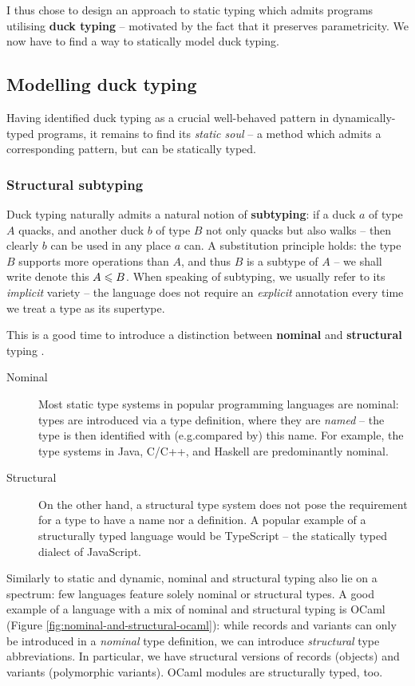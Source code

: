 I thus chose to design an approach to static typing which admits programs utilising \textbf{duck typing} -- motivated by the fact that it preserves parametricity. 
We now have to find a way to statically model duck typing.

\subsection{Modelling duck typing}
\label{subsec:duck-models}

Having identified duck typing as a crucial well-behaved pattern in dynamically-typed programs, it remains to find its \emph{static soul} -- a method which admits a corresponding pattern, but can be statically typed.

\subsubsection{Structural subtyping}

Duck typing naturally admits a natural notion of \textbf{subtyping}: if a duck $a$ of type $A$ quacks, and another duck $b$ of type $B$ not only quacks but also walks -- then clearly $b$ can be used in any place $a$ can. A substitution principle holds: the type $B$ supports more operations than $A$, and thus $B$ is a subtype of $A$ -- we shall write denote this $A \leqslant B$. When speaking of subtyping, we usually refer to its \emph{implicit} variety -- the language does not require an \emph{explicit} annotation every time we treat a type as its supertype.

This is a good time to introduce a distinction between \textbf{nominal} and \textbf{structural} typing \cite{pierce-book}. \begin{description}
    \item[Nominal] Most static type systems in popular programming languages are nominal: types are introduced via a type definition, where they are \emph{named} -- the type is then identified with (e.g.\@ compared by) this name. For example, the type systems in Java, C/C++, and Haskell are predominantly nominal.
    \item[Structural] On the other hand, a structural type system does not pose the requirement for a type to have a name nor a definition. A popular example of a structurally typed language would be TypeScript -- the statically typed dialect of JavaScript. 
\end{description}
Similarly to static and dynamic, nominal and structural typing also lie on a spectrum: few languages feature solely nominal or structural types. A good example of a language with a mix of nominal and structural typing is OCaml (Figure \ref{fig:nominal-and-structural-ocaml}): while records and variants can only be introduced in a \emph{nominal} type definition, we can introduce \emph{structural} type abbreviations. In particular, we have structural versions of records (objects) and variants (polymorphic variants). OCaml modules are structurally typed, too.

